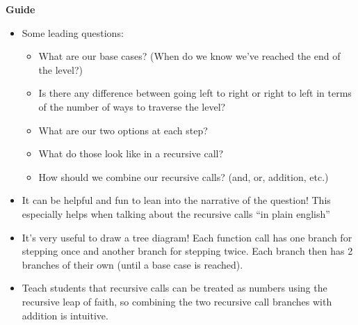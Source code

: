 \begin{blocksection}
\begin{guide}
\textbf{Guide}
\begin{itemize}
    \item Some leading questions:
    \begin{itemize}
        \item What are our base cases? (When do we know we’ve reached the end of the level?)
        \item Is there any difference between going left to right or right to left in terms of the number of ways to traverse the level?
        \item What are our two options at each step?
        \item What do those look like in a recursive call?
        \item How should we combine our recursive calls? (and, or, addition, etc.)
    \end{itemize}
    \item It can be helpful and fun to lean into the narrative of the question! This especially helps when talking about the recursive calls “in plain english”
    \item It’s very useful to draw a tree diagram! Each function call has one branch for stepping once and another branch for stepping twice. Each branch then has 2 branches of their own (until a base case is reached).
    \item Teach students that recursive calls can be treated as numbers using the recursive leap of faith, so combining the two recursive call branches with addition is intuitive.
\end{itemize}
\end{guide}
\end{blocksection}

